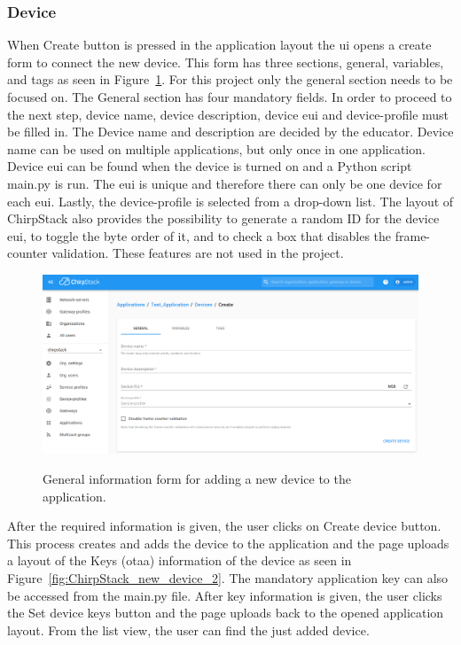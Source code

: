 \subsubsection{Device}
When Create button is pressed in the application layout the \gls{ui} opens a create form to connect the new device.
This form has three sections, general, variables, and tags as seen in Figure~\ref{fig:ChirpStack_new_device}.
For this project only the general section needs to be focused on.
The General section has four mandatory fields.
In order to proceed to the next step, device name, device description, device \gls{eui} and device-profile must be filled in.
The Device name and description are decided by the educator.
Device name can be used on multiple applications, but only once in one application.
Device \gls{eui} can be found when the device is turned on and a Python script main.py is run.
The \gls{eui} is unique and therefore there can only be one device for each \gls{eui}.
Lastly, the device-profile is selected from a drop-down list.
The layout of ChirpStack also provides the possibility to generate a random ID for the device \gls{eui}, to toggle the byte order of it, and to check a box that disables the frame-counter validation.
These features are not used in the project.

\clearpage

\begin{figure}[ht]
  \centering
  {\includegraphics[width=\textwidth]{illustration/ChirpStack_new_device.png}}
  \caption{General information form for adding a new device to the application.}
  \label{fig:ChirpStack_new_device}
\end{figure}

After the required information is given, the user clicks on Create device button.
This process creates and adds the device to the application and the page uploads a layout of the Keys (\gls{otaa}) information of the device as seen in Figure~\ref{fig:ChirpStack_new_device_2}.
The mandatory application key can also be accessed from the main.py file.
After key information is given, the user clicks the Set device keys button and the page uploads back to the opened application layout.
From the list view, the user can find the just added device.

